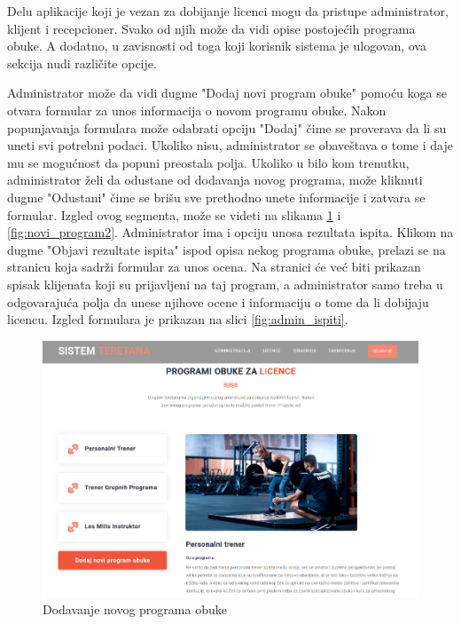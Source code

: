 Delu aplikacije koji je vezan za dobijanje licenci mogu da pristupe administrator, klijent i recepcioner. Svako od njih može da vidi opise postojećih programa obuke. A dodatno, u zavisnosti od toga koji korisnik sistema je ulogovan, ova sekcija nudi različite opcije.

Administrator može da vidi dugme "Dodaj novi program obuke" pomoću koga se otvara formular za unos informacija o novom programu obuke. Nakon popunjavanja formulara može odabrati opciju "Dodaj" čime se proverava da li su uneti svi potrebni podaci. Ukoliko nisu, administrator se obaveštava o tome i daje mu se mogućnost da popuni preostala polja. Ukoliko u bilo kom trenutku, administrator želi da odustane od dodavanja novog programa, može kliknuti dugme "Odustani" čime se brišu sve prethodno unete informacije i zatvara se formular. Izgled ovog segmenta, može se videti na slikama \ref{fig:novi_program1} i \ref{fig:novi_program2}.
Administrator ima i opciju unosa rezultata ispita. Klikom na dugme "Objavi rezultate ispita" ispod opisa nekog programa obuke, prelazi se na stranicu koja sadrži formular za unos ocena. Na stranici će već biti prikazan spisak klijenata koji su prijavljeni na taj program, a administrator samo treba u odgovarajuća polja da unese njihove ocene i informaciju o tome da li dobijaju licencu. Izgled formulara je prikazan na slici \ref{fig:admin_ispiti}.

\begin{figure}[!ht]
\begin{center}
\includegraphics[scale=0.30]{sections/korisnicki_interfejs/screenshots/licenca-admin.png}
\end{center}
\caption{Dodavanje novog programa obuke}
\label{fig:novi_program1}
\end{figure}

